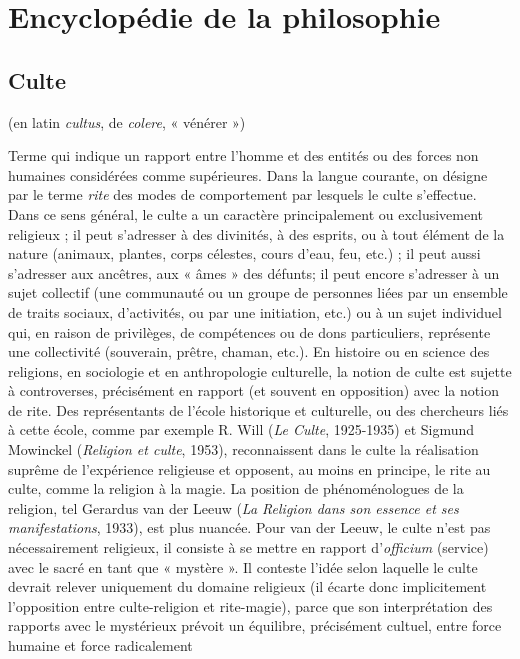 
\section{Encyclopédie de la philosophie}
\subsection{Culte}
(en latin {\it cultus}, de {\it colere}, « vénérer »)

Terme qui indique un rapport entre
l’homme et des entités ou des forces non
humaines considérées comme supérieures.
Dans la langue courante, on
désigne par le terme {\it rite} des modes de
comportement par lesquels le culte s’effectue.
Dans ce sens général, le culte a un
caractère principalement ou exclusivement
religieux ; il peut s'adresser à des
divinités, à des esprits, ou à tout élément
de la nature (animaux, plantes, corps
célestes, cours d’eau, feu, etc.) ; il peut
aussi s'adresser aux ancêtres, aux
« âmes » des défunts; il peut encore
s'adresser à un sujet collectif (une
communauté ou un groupe de personnes
liées par un ensemble de traits sociaux,
d’activités, ou par une initiation, etc.) ou
à un sujet individuel qui, en raison de privilèges,
de compétences ou de dons particuliers,
représente une collectivité
(souverain, prêtre, chaman, etc.). En histoire
ou en science des religions, en sociologie
et en anthropologie culturelle, la
notion de culte est sujette à controverses,
précisément en rapport (et souvent en
opposition) avec la notion de rite. Des
représentants de l’école historique et
culturelle, ou des chercheurs liés à cette
école, comme par exemple R. Will ({\it Le
Culte}, 1925-1935) et Sigmund Mowinckel
({\it Religion et culte}, 1953), reconnaissent
dans le culte la réalisation suprême de
l'expérience religieuse et opposent, au
moins en principe, le rite au culte, comme
la religion à la magie. La position de phénoménologues
de la religion, tel Gerardus
van der Leeuw ({\it La Religion dans son
essence et ses manifestations}, 1933), est
plus nuancée. Pour van der Leeuw, le
culte n’est pas nécessairement religieux, il
consiste à se mettre en rapport d’{\it officium}
(service) avec le sacré en tant que « mystère ».
Il conteste l’idée selon laquelle le
culte devrait relever uniquement du
domaine religieux (il écarte donc implicitement
l’opposition entre culte-religion et
rite-magie), parce que son interprétation
des rapports avec le mystérieux prévoit
un équilibre, précisément cultuel, entre
force humaine et force radicalement

